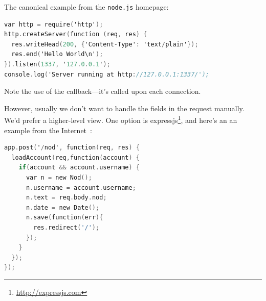The canonical example from the {\tt node.js} homepage:
\begin{lstlisting}[language=C]
var http = require('http');
http.createServer(function (req, res) {
  res.writeHead(200, {'Content-Type': 'text/plain'});
  res.end('Hello World\n');
}).listen(1337, '127.0.0.1');
console.log('Server running at http://127.0.0.1:1337/');
\end{lstlisting}

Note the use of the callback---it's called upon each connection.

However, usually we don't want to handle the fields in the request manually.
We'd prefer a higher-level view. One option is expressjs\footnote{\url{http://expressjs.com}},
and here's an an example from the Internet~\cite{nod.js}:
\begin{lstlisting}[language=C]
app.post('/nod', function(req, res) {
  loadAccount(req,function(account) {
    if(account && account.username) {
      var n = new Nod();
      n.username = account.username;
      n.text = req.body.nod;
      n.date = new Date();
      n.save(function(err){
        res.redirect('/');
      });
    }
  });
});
\end{lstlisting}






